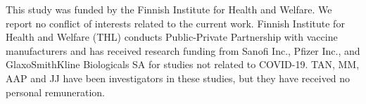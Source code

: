 \documentclass[aoas]{imsart}
\begin{document}
\begin{funding}

This study was funded by the Finnish Institute for Health and Welfare. We report no conflict of interests related to the current work. Finnish Institute for Health and Welfare (THL) conducts Public-Private Partnership with vaccine manufacturers and has received research funding from Sanofi Inc., Pfizer Inc., and GlaxoSmithKline Biologicals SA for studies not related to COVID-19. TAN, MM, AAP and JJ have been investigators in these studies, but they have received no personal remuneration.

\end{funding}


\begin{supplement}
\end{supplement}


\end{document}
